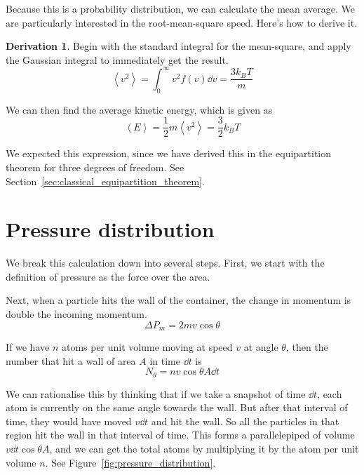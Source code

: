 \documentclass[12pt,chapterprefix=false,dvipsnames]{scrbook}
\theoremstyle{dotless}
\theoremstyle{definition}
\newtheorem{protoderivation}{Derivation}[section]
\newenvironment{derivation}
{\colorlet{shadecolor}{purple!15}\begin{shaded}\begin{protoderivation}}
			{\end{protoderivation}\end{shaded}}
\begin{document}
Because this is a probability distribution, we can calculate the
mean average. We are particularly interested in the
root-mean-square speed. Here's how to derive it.

\begin{derivation}
	Begin with the standard integral for the mean-square, and apply
	the Gaussian integral to immediately get the result.
	\begin{equation}
		\left<v^2\right>
		=
		\int^{\infty}_0 v^2
		f\left(v\right)\dd{v} =
		\frac{3k_B T}{m}
	\end{equation}

	We can then find the average kinetic energy, which is given as
	\begin{equation}
		\left<E\right>
		=
		\frac{1}{2}m\left<v^2\right>
		=
		\frac{3}{2}k_B T
	\end{equation}

	We expected this expression, since we have derived this in the
	equipartition theorem for three degrees of freedom. See
	Section~\ref{sec:classical_equipartition_theorem}.
\end{derivation}

\section{Pressure distribution}%
\label{sec:pressure_distribution}

We break this calculation down into several steps. First, we
start with the definition of pressure as the force over the
area.

Next, when a particle hits the wall of the container, the change
in momentum is double the incoming momentum.
\begin{equation}
	\Delta P_m = 2mv\cos{\theta}
\end{equation}

If we have $n$ atoms per unit volume moving
at speed $v$ at angle
$\theta$, then the number that hit a wall of area
$A$ in time $\dd{t}$ is
\begin{equation}
	N_{\theta} = nv\cos{\theta}A\dd{t}
\end{equation}

We can rationalise this by thinking that if we take a snapshot
of time $\dd{t}$, each atom is currently on the
same angle towards the wall. But after that interval of time,
they would have moved $v\dd{t}$ and hit the wall.
So all the particles in that region hit the wall in that
interval of time. This forms a parallelepiped of volume
$v\dd{t}\cos{\theta}A$, and we can get the total atoms by
multiplying it by the atom per unit volume
$n$. See Figure~\ref{fig:pressure_distribution}.
\end{document}
